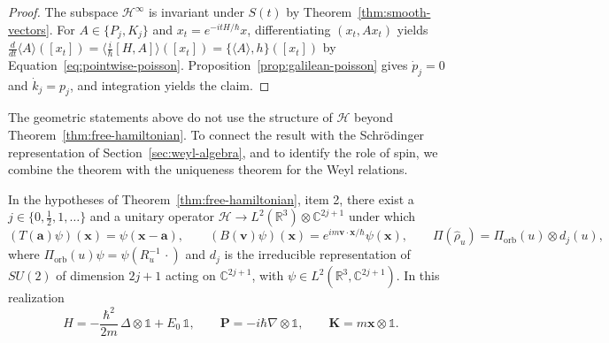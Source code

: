 \begin{proof}
	The subspace $\mathcal{H}^\infty$ is invariant under $S(t)$ by Theorem~\ref{thm:smooth-vectors}. For $A\in\{P_j,K_j\}$ and $x_t=e^{-itH/\hbar}x$, differentiating $(x_t,Ax_t)$ yields $\tfrac{d}{dt}\langle A\rangle([x_t])=\langle\tfrac{i}{\hbar}[H,A]\rangle([x_t])=\{\langle A\rangle,h\}([x_t])$ by Equation~\eqref{eq:pointwise-poisson}. Proposition~\ref{prop:galilean-poisson} gives $\dot p_j=0$ and $\dot k_j=p_j$, and integration yields the claim.
\end{proof}

The geometric statements above do not use the structure of $\mathcal{H}$ beyond Theorem~\ref{thm:free-hamiltonian}. To connect the result with the Schrödinger representation of Section~\ref{sec:weyl-algebra}, and to identify the role of spin, we combine the theorem with the uniqueness theorem for the Weyl relations.

\begin{corollary}\label{cor:schrodinger-realization}
	In the hypotheses of Theorem~\ref{thm:free-hamiltonian}, item 2, there exist a $j\in\{0,\tfrac{1}{2},1,\dots\}$ and a unitary operator $\mathcal{H}\to L^2(\mathbb{R}^3)\otimes\mathbb{C}^{2j+1}$ under which
	\begin{equation}
		(T(\mathbf{a})\psi)(\mathbf{x})=\psi(\mathbf{x}-\mathbf{a}),\qquad (B(\mathbf{v})\psi)(\mathbf{x})=e^{im\mathbf{v}\cdot\mathbf{x}/\hbar}\psi(\mathbf{x}),\qquad \Pi(\hat\rho_u)=\Pi_{\mathrm{orb}}(u)\otimes d_j(u),
	\end{equation}
	where $\Pi_{\mathrm{orb}}(u)\psi=\psi(R_u^{-1}\,\cdot)$ and $d_j$ is the irreducible representation of $SU(2)$ of dimension $2j+1$ acting on $\mathbb{C}^{2j+1}$, with $\psi\in L^2(\mathbb{R}^3,\mathbb{C}^{2j+1})$. In this realization
	\begin{equation}
		H=-\frac{\hbar^2}{2m}\,\Delta\otimes\mathbb{1}+E_0\,\mathbb{1}, \qquad \mathbf{P}=-i\hbar\nabla\otimes\mathbb{1}, \qquad \mathbf{K}=m\mathbf{x}\otimes\mathbb{1}.
	\end{equation}
\end{corollary}


